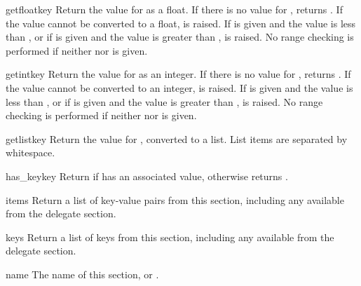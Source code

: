 \documentclass{howto}
\begin{document}
\begin{methoddesc}[Configuration]{getfloat}{key}
  Return the value for  as a float.  If there is no
  value for , returns .  If the value cannot
  be converted to a float,  is raised.  If
   is given and the value is less than , or if
   is given and the value is greater than ,
   is raised.  No range checking is performed if
  neither  nor  is given.
\end{methoddesc}

\begin{methoddesc}[Configuration]{getint}{key}
  Return the value for  as an integer.  If there is no
  value for , returns .  If the value cannot
  be converted to an integer,  is raised.  If
   is given and the value is less than , or if
   is given and the value is greater than ,
   is raised.  No range checking is performed if
  neither  nor  is given.
\end{methoddesc}

\begin{methoddesc}[Configuration]{getlist}{key}
  Return the value for , converted to a list.  List items are
  separated by whitespace.
\end{methoddesc}

\begin{methoddesc}[Configuration]{has_key}{key}
  Return  if  has an associated value, otherwise
  returns .
\end{methoddesc}

\begin{methoddesc}[Configuration]{items}{}
  Return a list of key-value pairs from this section, including any
  available from the delegate section.
\end{methoddesc}

\begin{methoddesc}[Configuration]{keys}{}
  Return a list of keys from this section, including any available
  from the delegate section.
\end{methoddesc}

\begin{memberdesc}[Configuration]{name}
  The name of this section, or .
\end{memberdesc}
\end{document}
